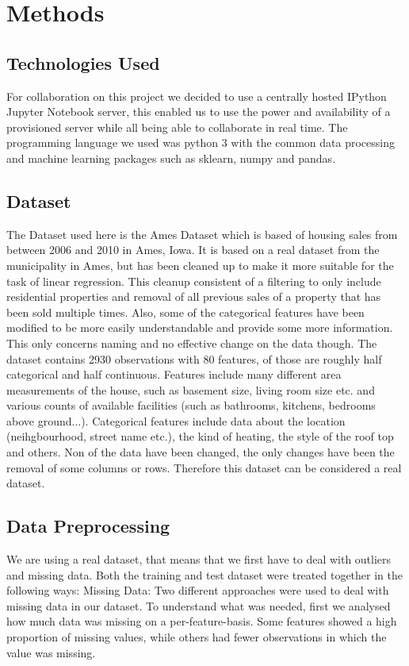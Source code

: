 \section{Methods}
\subsection{Technologies Used}
For collaboration on this project we decided to use a centrally hosted IPython Jupyter Notebook server, this enabled us to use the power and availability of a provisioned server while all being able to collaborate in real time. The programming language we used was python 3 with the common data processing and machine learning packages such as sklearn, numpy and pandas.
\subsection{Dataset}
The Dataset used here is the Ames Dataset \cite{cock_2011} which is based of housing sales from between 2006 and 2010 in Ames, Iowa.
It is based on a real dataset from the municipality in Ames, but has been cleaned up to make it more suitable for the task of linear regression.
This cleanup consistent of a filtering to only include residential properties and removal of all previous sales of a property that has been sold multiple times.
Also, some of the categorical features have been modified to be more easily understandable and provide some more information. This only concerns naming and no effective change on the data though.
The dataset contains 2930 observations with 80 features, of those are roughly half categorical and half continuous. Features include many different area measurements of the house, such as basement size, living room size etc. and various counts of available facilities (such as bathrooms, kitchens, bedrooms above ground...). Categorical features include data about the location (neihgbourhood, street name etc.), the kind of heating, the style of the roof top and others.
Non of the data have been changed, the only changes have been the removal of some columns or rows. Therefore this dataset can be considered a real dataset.
\subsection{Data Preprocessing}
We are using a real dataset, that means that we first have to deal with outliers and missing data. Both the training and test dataset were treated together in the following ways:
Missing Data:\newline
Two different approaches were used to deal with missing data in our dataset. To understand what was needed, first we analysed how much data was missing on a per-feature-basis. Some features showed a high proportion of missing values, while others had fewer observations in which the value was missing.

